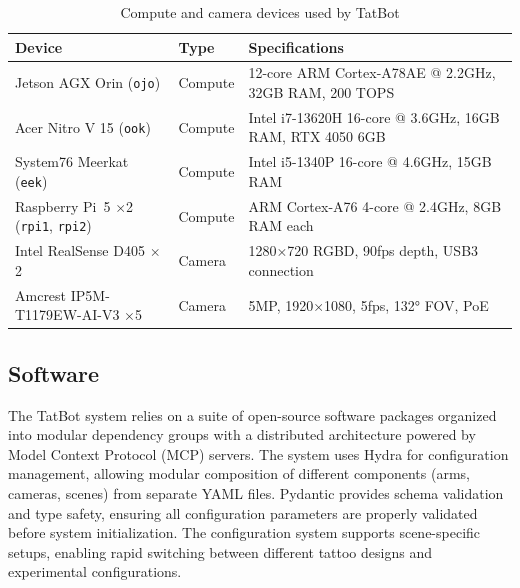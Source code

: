 \documentclass[11pt]{article}
\begin{document}
\begin{table}[h]
    \centering
    \caption{Compute and camera devices used by TatBot}
    \label{tab:hardware-devices}
    \begin{tabular}{lll}
        \toprule
        Device & Type & Specifications \\
        \midrule
        Jetson AGX Orin (\texttt{ojo}) & Compute & 12-core ARM Cortex-A78AE @ 2.2GHz, 32GB RAM, 200 TOPS \\
        Acer Nitro V 15 (\texttt{ook}) & Compute & Intel i7-13620H 16-core @ 3.6GHz, 16GB RAM, RTX 4050 6GB \\
        System76 Meerkat (\texttt{eek}) & Compute & Intel i5-1340P 16-core @ 4.6GHz, 15GB RAM \\
        Raspberry Pi~5 $\times$2 (\texttt{rpi1}, \texttt{rpi2}) & Compute & ARM Cortex-A76 4-core @ 2.4GHz, 8GB RAM each \\
        Intel RealSense D405 $\times$2 & Camera & 1280×720 RGBD, 90fps depth, USB3 connection \\
        Amcrest IP5M-T1179EW-AI-V3 $\times$5 & Camera & 5MP, 1920×1080, 5fps, 132° FOV, PoE \\
        \bottomrule
    \end{tabular}
\end{table}

\subsection{Software}

The TatBot system relies on a suite of open-source software packages organized into modular dependency groups with a distributed architecture powered by Model Context Protocol (MCP) servers.
The system uses Hydra for configuration management, allowing modular composition of different components (arms, cameras, scenes) from separate YAML files.
Pydantic provides schema validation and type safety, ensuring all configuration parameters are properly validated before system initialization.
The configuration system supports scene-specific setups, enabling rapid switching between different tattoo designs and experimental configurations.
\end{document}

